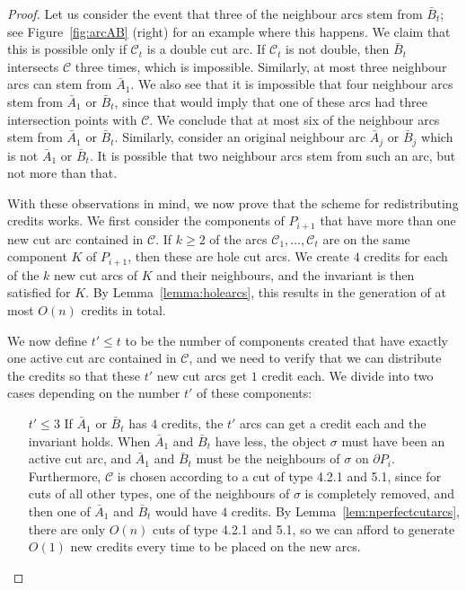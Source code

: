 \documentclass{article}
\newcommand{\PP}{P}
\newcommand{\KO}{K}
\newcommand{\se}{\sigma}
\newcommand{\cut}{\mathcal C}
\newcommand{\arcA}{A}
\newcommand{\arcB}{B}
\begin{document}
\begin{proof}
Let us consider the event that three of the neighbour arcs stem from $\bar\arcB_t$; see Figure~\ref{fig:arcAB} (right) for an example where this happens.
We claim that this is possible only if 
$\cut_t$ is a double cut arc.
If 
$\cut_t$ is not double, then $\bar\arcB_t$ intersects $\cut$ three times, which is impossible.
Similarly, at most three neighbour arcs can stem from $\bar\arcA_1$.
We also see that it is impossible that four neighbour arcs stem from $\bar\arcA_1$ or $\bar\arcB_t$, since that would imply that one of these arcs had three intersection points with $\cut$.
We conclude that at most six of the neighbour arcs stem from $\bar\arcA_1$ or $\bar\arcB_t$.
Similarly, consider an original neighbour arc $\bar\arcA_j$ or $\bar\arcB_j$ which is not $\bar\arcA_1$ or $\bar\arcB_t$.
It is possible that two neighbour arcs stem from such an arc, but not more than that.

With these observations in mind, we now prove that the scheme for redistributing credits works.
We first consider the components of $\PP_{i+1}$ that have more than one new cut arc contained in $\cut$. 
If $k\geq 2$ of the arcs $\cut_1,\ldots,\cut_t$ are on the same component $\KO$ of $\PP_{i+1}$, then these are hole cut arcs.
We create $4$ credits for each of the $k$ new cut arcs of $\KO$ and their neighbours, and the invariant is then satisfied for $\KO$.
By Lemma~\ref{lemma:holearcs}, this results in the generation of at most $O(n)$ credits in total.

We now define $t'\leq t$ to be the number of components created that have exactly one active cut arc contained in $\cut$, and we need to verify that we can distribute the credits so that these $t'$ new cut arcs get $1$ credit each.
We divide into two cases depending on the number $t'$ of these components:
\begin{itemize}
\item[$t'\leq 3$]
If $\bar\arcA_1$ or $\bar\arcB_t$ has $4$ credits, the $t'$ arcs can get a credit each and the invariant holds.
When $\bar\arcA_1$ and $\bar\arcB_t$ have less, the object $\se$ must have been an active cut arc, and $\bar\arcA_1$ and $\bar\arcB_t$ must be the neighbours of $\se$ on $\partial\PP_i$.
Furthermore, $\cut$ is chosen according to a cut of type 4.2.1 and 5.1, since for cuts of all other types, one of the neighbours of $\se$ is completely removed, and then one of $\bar\arcA_1$ and $\bar\arcB_t$ would have $4$ credits.
By Lemma~\ref{lem:nperfectcutarcs}, there are only $O(n)$ cuts of type 4.2.1 and 5.1, so we can afford to generate $O(1)$ new credits every time to be placed on the new arcs.


\end{itemize}
\end{proof}
\end{document}
